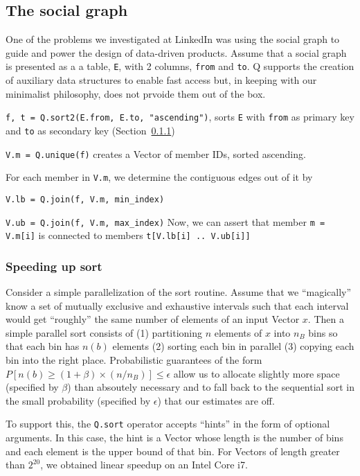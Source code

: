 \subsection{The social graph}
\label{social_graph}

One of the problems we investigated at LinkedIn was using the social graph to
guide and power the design of data-driven products.
Assume that a social graph is presented as a 
a table, {\tt E}, with 2 columns, {\tt from} and {\tt to}. Q supports the
creation of auxiliary data structures to enable fast access but, in keeping with
our minimalist philosophy, does not prvoide them out of the box.
\be
\item {\tt f, t = Q.sort2(E.from, E.to, "ascending")}, sorts {\tt E}
with {\tt from} as primary key and {\tt to} as
secondary key (Section~\ref{par_sort})
\item {\tt V.m = Q.unique(f)} creates a Vector of 
member IDs, sorted ascending. 
\item For each member in {\tt V.m}, we determine the contiguous edges out of it
  by 
  \be
\item {\tt V.lb = Q.join(f, V.m, min\_index)}
\item {\tt V.ub = Q.join(f, V.m, max\_index)}
  \ee
Now, we can assert that member
{\tt m = V.m[i]} is connected to members {\tt t[V.lb[i] .. V.ub[i]]}
\ee


\subsubsection{Speeding up sort}
\label{par_sort}
Consider a simple parallelization of the sort routine. Assume that we 
``magically'' know a set of mutually exclusive and exhaustive intervals such
that each interval would get ``roughly'' the same number of elements of an input
Vector \(x\). Then a simple parallel sort consists of 
(1) partitioning \(n\) elements of \(x\) into \(n_B\) bins so that each bin has
\(n(b)\) elements
(2) sorting each bin in parallel
(3) copying each bin into the right place. Probabilistic guarantees
of the form \(P[n(b) \geq (1+\beta) \times(n/n_B)] \leq \epsilon\) 
allow us to allocate slightly more space (specified by \(\beta\)) than absoutely necessary and to 
fall back to the sequential sort in the small probability (specified by
\(\epsilon\))  that our estimates are off.

To support this, the {\tt Q.sort} operator accepts ``hints'' in the form of
optional arguments. In this case, the hint is a Vector whose length is the
number of bins and each element is the upper bound of that bin. For Vectors of
length greater than \(2^{20}\), we obtained linear speedup on an Intel Core i7.

